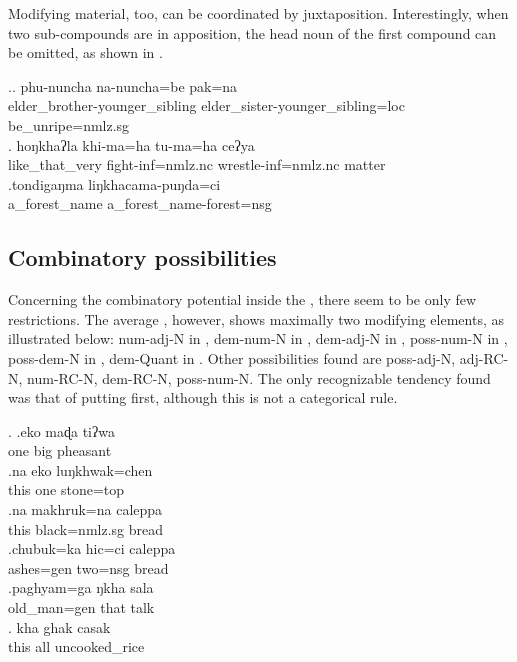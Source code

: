 Modifying material, too, can be coordinated by juxtaposition. Interestingly, when two sub-compounds are in apposition, the head noun of the first compound can be omitted, as shown in \Next[c].

\ex.\ag. phu-nuncha    na-nuncha=be     pak=na\\
elder\_brother-younger\_sibling elder\_sister-younger\_sibling{\sc =loc} be\_unripe{\sc =nmlz.sg}\\
 
\bg. hoŋkhaʔla khi-ma=ha     tu-ma=ha     ceʔya \\
like\_that\_very fight{\sc -inf=nmlz.nc} wrestle{\sc -inf=nmlz.nc} matter\\
 
 \bg.tondigaŋma liŋkhacama-puŋda=ci\\
  a\_forest\_name a\_forest\_name-forest{\sc =nsg}\\
   
 
\subsection{Combinatory possibilities}

Concerning the combinatory potential inside the , there seem to be only few restrictions. The average , however, shows maximally two modi\-fying elements, as illustrated below: {\sc num-adj-N} in \Next[a], {\sc dem-num-N} in \Next[b], {\sc dem-adj-N} in \Next[c], {\sc poss-num-N} in \Next[d], {\sc poss-dem-N} in \Next[e], {\sc dem-Quant } in \Next[f]. Other possibilities found are {\sc poss-adj-N}, {\sc adj-RC-N}, {\sc num-RC-N}, {\sc dem-RC-N}, {\sc poss-num-N}. The only recognizable tendency found was that of putting  first, although this is not a categorical rule.
 	
 \ex. \ag.eko maɖa tiʔwa\\
 one big pheasant\\
  
 \bg.na   eko luŋkhwak=chen\\
 this one stone{\sc =top}\\
  
  \bg.na   makhruk=na caleppa \\
this black{\sc =nmlz.sg} bread\\
  
  \bg.chubuk=ka    hic=ci     caleppa\\
 ashes{\sc =gen} two{\sc =nsg} bread\\
  
  \bg.paghyam=ga    ŋkha sala\\
 old\_man{\sc =gen} that talk\\
  
 \bg.      kha  ghak casak\\
 this  all uncooked\_rice\\
 
